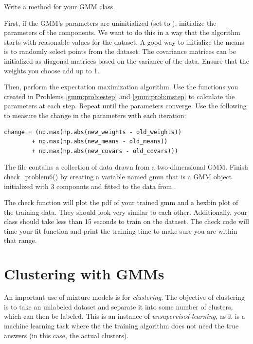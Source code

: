 \begin{problem}
Write a  method for your GMM class.

First, if the GMM's parameters are uninitialized (set to ), initialize the parameters of the components.
We want to do this in a way that the algorithm starts with reasonable values for the dataset.
A good way to initialize the means is to randomly select points from the dataset.
The covariance matrices can be initialized as diagonal matrices based on the variance of the data.
Ensure that the weights you choose add up to 1.%

Then, perform the expectation maximization algorithm.
Use the functions you created in Problems \ref{gmm:prob:estep} and \ref{gmm:prob:mstep} to calculate the parameters at each step.
Repeat until the parameters converge.
Use the following to measure the change in the parameters with each iteration:
\begin{lstlisting}
change = (np.max(np.abs(new_weights - old_weights))
        + np.max(np.abs(new_means - old_means))
        + np.max(np.abs(new_covars - old_covars)))
\end{lstlisting}%

The file  contains a collection of data drawn from a two-dimensional GMM.
Finish check\_problem6() by creating a variable named gmm that is a GMM object initialized with 3
componnts and fitted to the data from  .

The check function will plot the pdf of your trained gmm and a hexbin plot of the training data. They should
look very similar to each other. Additionally, your class should take less than 15 seconds to train on the dataset.
The check code will time your fit function and print the training time to make sure you are within that range.
\end{problem}

\section*{Clustering with GMMs}

An important use of mixture models is for \emph{clustering}.
The objective of clustering is to take an unlabeled dataset and separate it into some number of clusters, which can then be labeled.
This is an instance of \emph{unsupervised learning}, as it is a machine learning task where the the training algorithm does not need the true answers (in this case, the actual clusters).

